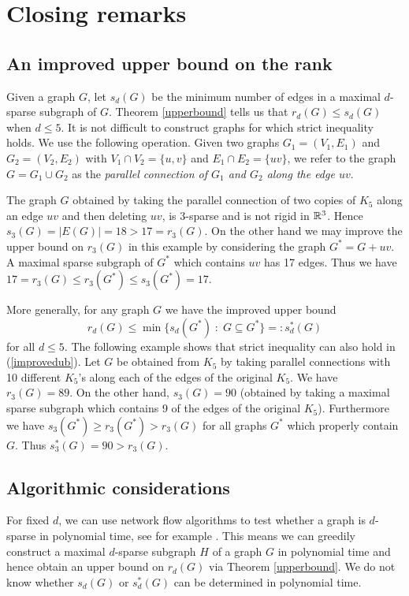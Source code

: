 \documentclass[11pt]{article}
\begin{document}
\section{Closing remarks}
\subsection*{An improved upper bound on the rank}
Given a graph $G$, let $s_d(G)$ be the minimum number of edges in a
maximal $d$-sparse subgraph of $G$. Theorem \ref{upperbound} tells
us that $r_d(G)\leq s_d(G)$ when $d\leq 5$. It is not difficult to
construct graphs for which strict inequality holds. We use the
following operation. Given two graphs $G_1=(V_1,E_1)$ and
$G_2=(V_2,E_2)$ with $V_1\cap V_2=\{u,v\}$ and $E_1\cap E_2=\{uv\}$,
we refer to the graph $G=G_1\cup G_2$ as the {\em parallel
connection of $G_1$ and $G_2$ along the edge $uv$}.

The graph $G$ obtained by taking the parallel connection of two
copies of $K_5$ along an edge $uv$ and then deleting $uv$, is
3-sparse and is not rigid in ${\mathbb R}^3$. Hence
$s_3(G)=|E(G)|=18>17=r_3(G)$. On the other hand we may improve the
upper bound on $r_3(G)$ in this example by considering the graph
$G^*=G+uv$. A maximal sparse subgraph of $G^*$ which contains $uv$
has 17 edges. Thus we have $17=r_3(G)\leq r_3(G^*)\leq s_3(G^*)=17$.

More generally, for any graph $G$ we have the improved upper bound
\begin{equation}\label{improvedub}
r_d(G)\leq \min\{s_d(G^*)\;:\;G\subseteq G^*\}=:s_d^*(G)
\end{equation}
for all $d\leq 5$. The following example shows that strict
inequality can also hold in (\ref{improvedub}). Let $G$ be obtained
from $K_5$ by taking parallel connections with 10 different $K_5$'s
along each of the edges of the original $K_5$. We have $r_3(G)=89$.
On the other hand,
 $s_3(G)=90$ (obtained by taking a maximal sparse
subgraph which contains 9 of the edges of the original $K_5$).
Furthermore we have $s_3(G^*)\geq r_3(G^*)> r_3(G)$ for all graphs
$G^*$ which properly contain $G$. Thus  $s_3^*(G)=90>r_3(G)$.

\subsection*{Algorithmic considerations}
For fixed $d$, we can use network flow algorithms to test whether a
graph is $d$-sparse in polynomial time, see for example \cite{BJ}.
This means we can greedily construct a maximal $d$-sparse subgraph
$H$ of a graph $G$ in polynomial time and hence obtain an upper
bound on $r_d(G)$ via Theorem \ref{upperbound}. We do not know
whether $s_d(G)$ or $s_d^*(G)$ can be determined in polynomial time.
\end{document}
